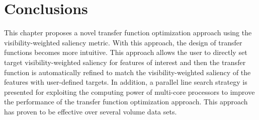 \section{Conclusions}
This chapter proposes a novel transfer function optimization approach using the visibility-weighted saliency metric.
With this approach, the design of transfer functions becomes more intuitive. This approach allows the user to directly set target visibility-weighted saliency for features of interest and then the transfer function is automatically refined to match the visibility-weighted saliency of the features with user-defined targets. In addition, a parallel line search strategy is presented for exploiting the computing power of multi-core processors to improve the performance of the transfer function optimization approach.
This approach has proven to be effective over several volume data sets.
